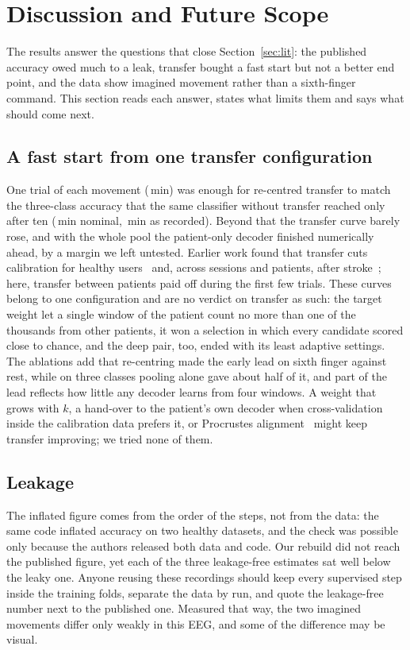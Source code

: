 \section{Discussion and Future Scope}
\label{sec:discussion}

The results answer the questions that close Section~\ref{sec:lit}: the published accuracy owed much
to a leak, transfer bought a fast start but not a better end point, and the data show imagined
movement rather than a sixth-finger command. This section reads each answer, states what limits
them and says what should come next.

\subsection{A fast start from one transfer configuration}
One trial of each movement (\rqTwoMinutesKOne\,min) was enough for re-centred transfer to match
the three-class accuracy that the same classifier without transfer reached only after ten
(\rqTwoMinutesKTen\,min nominal, \rqTwoMinutesRecordedKTen\,min as recorded). Beyond that the
transfer curve barely rose, and with the whole pool the patient-only decoder finished numerically
ahead, by a margin we left untested. Earlier work found that transfer cuts calibration for
healthy users~\cite{zanini2018,he2020,wu2022review} and, across sessions and patients, after
stroke~\cite{giles2022,cao2021}; here, transfer between patients paid off during the first few
trials. These curves belong to one configuration and are no verdict on transfer as such: the
target weight let a single window of the patient count no more than one of the thousands from
other patients, it won a selection in which every candidate scored close to chance, and the deep
pair, too, ended with its least adaptive settings. The ablations add that re-centring made the early lead on sixth finger against rest, while on
three classes pooling alone gave about half of it, and part of the lead reflects how little any
decoder learns from four windows. A weight that grows with $k$, a hand-over to the patient's own decoder when
cross-validation inside the calibration data prefers it, or Procrustes
alignment~\cite{rodrigues2019} might keep transfer improving; we tried none of them.

\subsection{Leakage}
The inflated figure comes from the order of the steps, not from the data: the same code inflated
accuracy on two healthy datasets, and the check was possible only because the authors released
both data and code. Our rebuild did not reach the published figure, yet each of the three
leakage-free estimates sat well below the leaky one. Anyone reusing these recordings should keep
every supervised step inside the training folds, separate the data by run, and quote the
leakage-free number next to the published one. Measured that way, the two imagined movements
differ only weakly in this EEG, and some of the difference may be visual.

